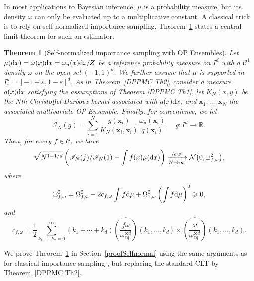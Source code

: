\documentclass[a4paper,11pt]{article}
\numberwithin{equation}{section}
\newtheorem{theorem}{Theorem}[]
\theoremstyle{definition}
\newtheorem{Remark}[]{Remark}
\newenvironment{remark}{\begin{Remark}\rm}{\end{Remark}}
\newcommand{\rev}[1]{#1}
\newcommand{\eq}{\begin{equation}}
\newcommand{\qe}{\end{equation}}
\newcommand{\bv}{\mathbf}
\renewcommand{\leq}{\leqslant}
\renewcommand{\geq}{\geqslant}
\renewcommand{\epsilon}{\varepsilon}
\renewcommand{\d}{ {\rm d}}
\begin{document}

\rev{
In most applications to Bayesian inference, $\mu$ is a probability measure, but its density $\omega$ can only be evaluated up to a multiplicative constant. A classical trick is to rely on self-normalized importance sampling. Theorem~\ref{DPPMC Th3} states a central limit theorem for such an estimator.
\begin{theorem}[Self-normalized importance sampling with OP Ensembles]
\label{DPPMC Th3}
Let $\mu(\d x)=\omega(x)\d x = \omega_u(x) \d x/Z$ be a reference probability measure on $I^d$ with a $\mathscr C^1$ density $\omega$ on the open set $(-1,1)^d$. We further assume that $\mu$ is supported in $I_\epsilon^d = [-1+\epsilon,1-\epsilon]^d$. As in Theorem~\ref{DPPMC Th2}, consider a measure $q(x)\d x$ satisfying the assumptions of Theorem \ref{DPPMC Th1}, let $K_N(x,y)$ be the $N$th Christoffel-Darboux kernel associated with $q(x)\d x$, and $\bv x_1,\ldots,\bv x_N$ the associated multivariate OP Ensemble. Finally, for convenience, we let
$$ \mathscr{I}_N(g) = \sum_{i=1}^N \frac{g(\bv x_i)}{K_N(\bv x_i,\bv
    x_i)}\frac{\omega_u(\bv x_i)}{q(\bv x_i)}, \quad g:I^d\rightarrow\mathbb{R}.$$
Then, for every $f\in\mathscr C$, we have
\begin{align}
\sqrt{N^{1+1/d}}\left( \mathscr{I}_N(f)/\mathscr{I}_N(1) - \int f(x) \mu(\d
  x)\right) \xrightarrow[N\to\infty]{law } \mathcal
N\big(0,\Xi_{f,\omega}^2\big),
\label{e:selfNormalizedWeightedCLT}
\end{align}
where $$\Xi_{f,\omega}^2 = \Omega^2_{f,\omega} -2c_{f,\omega}\int f\d\mu + \Omega_{1,\omega}^2\left(\int f\d\mu\right)^2 \geq 0,$$
and
$$ c_{f,\omega} = \frac1{2}\sum_{k_1,\ldots,k_d=0}^\infty (k_1+\cdots+k_d)  \widehat{ \left(\frac{f \omega}{\omega_{eq}^{\otimes d}}\right)}(k_1,\ldots,k_d) \times \widehat{ \left(\frac{\omega}{\omega_{eq}^{\otimes d}}\right)}(k_1,\ldots,k_d).$$
\end{theorem}
}
\rev{
We prove Theorem~\ref{DPPMC Th3} in Section~\ref{proofSelfnormal} using the same arguments as for classical importance sampling \cite[Section 7.1.3]{Sch12}, but replacing the standard CLT by Theorem~\ref{DPPMC Th2}.
}
\end{document}
